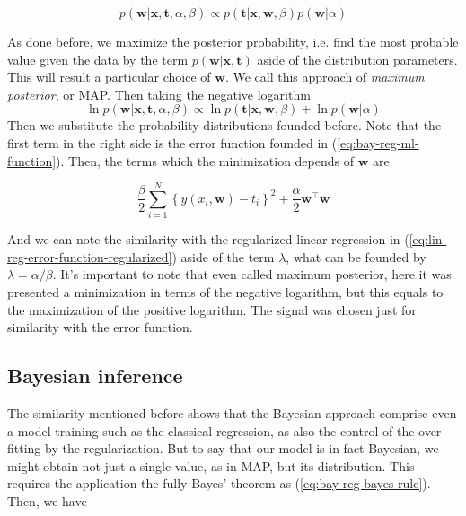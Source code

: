 \documentclass[11pt]{article} %
\begin{document}
\begin{equation}
   p(\mathbf{w} | \mathbf{x}, \mathbf{t}, \alpha, \beta) \propto p(\mathbf{t} | \mathbf{x}, \mathbf{w}, \beta) p(\mathbf{w} | \alpha)
\end{equation}

As done before, we maximize the posterior probability, i.e. find the most probable value given the data by the term $p(\mathbf{w} | \mathbf{x}, \mathbf{t}) $ aside of the distribution parameters. This will result a particular choice of $\mathbf{w}$. We call this approach of \textit{maximum posterior}, or MAP. Then taking the negative logarithm
%
\begin{equation}
   \ln p(\mathbf{w} | \mathbf{x}, \mathbf{t}, \alpha, \beta) \propto \ln p(\mathbf{t} | \mathbf{x}, \mathbf{w}, \beta) + \ln p(\mathbf{w} | \alpha)
\end{equation}
%
Then we substitute the probability distributions founded before. Note that the first term in the right side is the error function founded in (\ref{eq:bay-reg-ml-function}). Then, the terms which the minimization depends of $\mathbf{w}$ are

\begin{equation}
    \frac{\beta}{2} \sum_{i=1}^{N}\left\{y\left(x_{i}, \mathbf{w}\right)-t_{i}\right\}^{2} + \frac{\alpha}{2} \mathbf{w}^\top \mathbf{w}
\end{equation}

And we can note the similarity with the regularized linear regression in (\ref{eq:lin-reg-error-function-regularized}) aside of the term $\lambda$, what can be founded by $\lambda=\alpha / \beta$. It's important to note that even called maximum posterior, here it was presented a minimization in terms of the negative logarithm, but this equals to the maximization of the positive logarithm. The signal was chosen just for similarity with the error function.

\subsection{Bayesian inference}

The similarity mentioned before shows that the Bayesian approach comprise even a model training such as the classical regression, as also the control of the over fitting by the regularization. But to say that our model is in fact Bayesian, we might obtain not just a single value, as in MAP, but its distribution. This requires the application the fully Bayes' theorem as (\ref{eq:bay-reg-bayes-rule}). Then, we have
\end{document}
